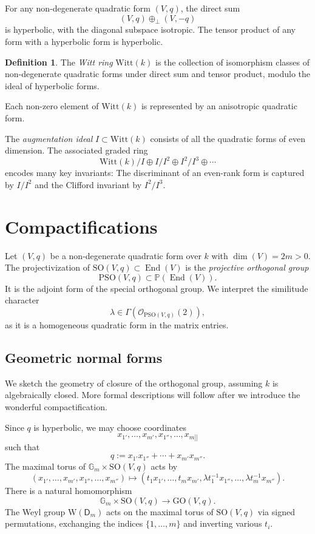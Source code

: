 \documentclass[12pt]{amsart}
\numberwithin{equation}{section}
\newcommand{\ra}{\rightarrow}
\newcommand{\bG}{\mathbb{G}}
\newcommand{\bP}{\mathbb{P}}
\newcommand{\cO}{\mathcal{O}}
\newcommand{\End}{\operatorname{End}}
\newcommand{\GO}{\mathrm{GO}}
\newcommand{\PSO}{\mathrm{PSO}}
\newcommand{\SO}{\mathrm{SO}}
\newcommand{\Witt}{\mathrm{Witt}}
\theoremstyle{plain}
\theoremstyle{definition}
\newtheorem{defi}[prop]{Definition}
\theoremstyle{remark}
\begin{document}
For any non-degenerate quadratic form $(V,q)$, the direct sum
$$(V,q) \oplus_{\perp} (V,-q)$$
is hyperbolic, with the diagonal subspace isotropic. 
The tensor product of any form with a hyperbolic form is hyperbolic.
\begin{defi} \cite[\S 2]{EKMbook}
\label{defn:wittring}
The {\em Witt ring} $\Witt(k)$ is the collection of isomorphism
classes of non-degenerate
quadratic forms under direct sum and tensor product, modulo the 
ideal of hyperbolic forms. 
\end{defi}
Each non-zero element of $\Witt(k)$ is represented by an anisotropic quadratic form. 

The {\em augmentation ideal} $I \subset \Witt(k)$ consists of all
the quadratic forms of even dimension. The associated graded ring
$$\Witt(k)/I  \oplus I/I^2 \oplus I^2/I^3 \oplus \cdots $$
encodes many key invariants: The discriminant of an even-rank 
form is captured by $I/I^2$ and the Clifford invariant by $I^2/I^3$.

\section{Compactifications}
\label{sect:compactify}
Let $(V,q)$ be a non-degenerate quadratic form
over $k$ with $\dim(V)=2m>0$. 
The projectivization of $\SO(V,q) \subset \End(V)$ 
is the {\em projective orthogonal group}
$$\PSO(V,q) \subset \bP(\End(V)).$$
It is the adjoint form of the special orthogonal group.
We interpret the similitude character 
$$\lambda \in \Gamma(\cO_{\PSO(V,q)}(2)),$$
as it is a homogeneous quadratic form in the matrix
entries. 

\subsection*{Geometric normal forms}
We sketch the geometry of closure of the orthogonal 
group, assuming $k$ is algebraically closed. 
More formal descriptions will follow after
we introduce the wonderful compactification.


Since $q$ is hyperbolic, we may choose coordinates $$x_{1'},\ldots,x_{m'},x_{1''},\ldots,x_{m]]}$$ such that
$$q:=x_{1'}x_{1''}+\cdots+x_{m'}x_{m''}.$$
The maximal torus of $\bG_m \times \SO(V,q)$ acts by
$$(x_{1'},\ldots,x_{m'},x_{1''},\ldots,x_{m''}) \mapsto
(t_1x_{1'},\ldots,t_mx_{m'},\lambda t_1^{-1} x_{1''},\ldots, \lambda t_m^{-1} x_{m''}).$$
There is a natural homomorphism
$$\bG_m \times \SO(V,q) \ra \GO(V,q).$$
The Weyl group $\mathrm W(\mathsf D_m)$ acts on the maximal torus of
$\SO(V,q)$ via signed permutations, exchanging the indices
$\{1,\ldots,m\}$ and inverting various $t_i$. 
\end{document}
